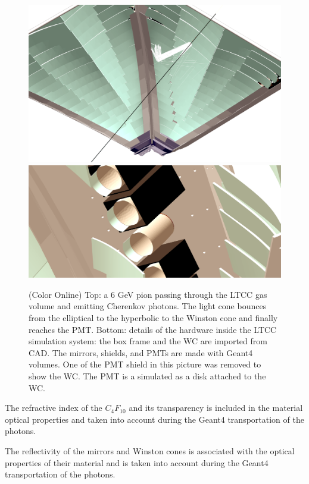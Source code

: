 \begin{figure}
	\centering
	\includegraphics[width=0.99\columnwidth, keepaspectratio]{img/ltccGeometry.png}
	\includegraphics[width=0.99\columnwidth, keepaspectratio]{img/ltccDetail.png}
	\caption{(Color Online) Top: a 6 GeV pion passing through the LTCC gas volume and emitting Cherenkov photons. The light cone
            bounces from the elliptical to the hyperbolic to the Winston cone and finally reaches the PMT.
            Bottom: details of the hardware inside the LTCC simulation system: the box frame and the WC are
            imported from CAD. The mirrors, shields, and PMTs are made with Geant4 volumes. One of the PMT shield
            in this picture was removed to show the WC. The PMT is a simulated as a disk attached to the WC. }
	\label{fig:ltccGeometry}
\end{figure}

The refractive index of the $C_4F_{10}$ and its transparency is included in the material optical properties and taken
into account during the Geant4 transportation of the photons.

The reflectivity of the mirrors and Winston cones is associated with the optical properties of their material and
is taken into account during the Geant4 transportation of the photons.

